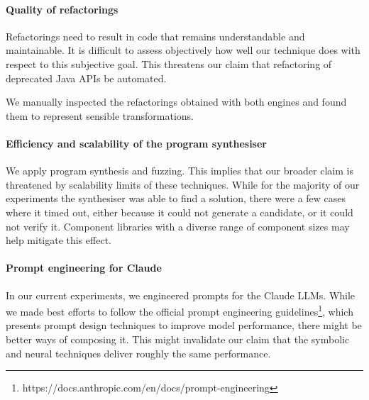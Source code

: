 \documentclass[sigconf,review,anonymous]{acmart}
\begin{document}
\paragraph{Quality of refactorings} Refactorings need to result in code that
remains understandable and maintainable.  It is difficult to assess
objectively how well our technique does with respect to this subjective
goal.  This threatens our claim that refactoring of deprecated Java APIs
be automated.

%
We manually inspected the refactorings obtained with
both engines and found them to represent sensible transformations.

\paragraph{Efficiency and scalability of the program synthesiser}
%
We apply program synthesis and fuzzing.  This implies that our broader claim
is threatened by scalability limits of these techniques.  While for the
majority of our experiments the synthesiser was able to find a solution,
there were a few cases where it timed out, either because it could not
generate a candidate, or it could not verify it.  Component libraries with a
diverse range of component sizes may help mitigate this effect.

\paragraph{Prompt engineering for Claude}
%
In our current experiments, we engineered prompts for the Claude LLMs. 
While we made best efforts to follow the official prompt engineering
guidelines\footnote{https://docs.anthropic.com/en/docs/prompt-engineering},
which presents prompt design techniques to improve model performance, there
might be better ways of composing it.  This might invalidate our claim that
the symbolic and neural techniques deliver roughly the same performance.

%
\end{document}
